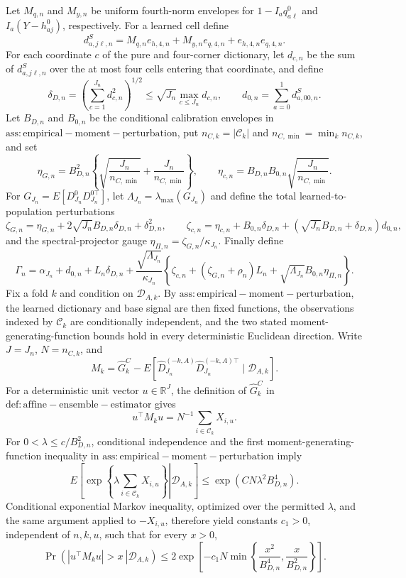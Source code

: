 Let \(M_{q,n}\) and \(M_{y,n}\) be uniform fourth-norm envelopes for \(1-I_aq^0_{a\ell}\) and \(I_a(Y-h^0_{aj})\), respectively.  For a learned cell define
\[
 d^S_{a,j\ell,n}=M_{q,n}e_{h,4,n}+M_{y,n}e_{q,4,n}+e_{h,4,n}e_{q,4,n}.
\]
For each coordinate \(c\) of the pure and four-corner dictionary, let \(d_{c,n}\) be the sum of \(d^S_{a,j\ell,n}\) over the at most four cells entering that coordinate, and define
\[
 \delta_{D,n}=\left(\sum_{c=1}^{J_n}d_{c,n}^2\right)^{1/2}
 \le \sqrt{J_n}\max_{c\le J_n}d_{c,n},
 \qquad
 d_{0,n}=\sum_{a=0}^1d^S_{a,00,n}.
\]
Let \(B_{D,n}\) and \(B_{0,n}\) be the conditional calibration envelopes in \(\mathrm{ass:empirical-moment-perturbation}\), put \(n_{C,k}=|\mathcal C_k|\) and \(n_{C,\min}=\min_k n_{C,k}\), and set
\[
 \eta_{G,n}=B_{D,n}^2\left\{\sqrt{\frac{J_n}{n_{C,\min}}}
 +\frac{J_n}{n_{C,\min}}\right\},
 \qquad
 \eta_{c,n}=B_{D,n}B_{0,n}\sqrt{\frac{J_n}{n_{C,\min}}}.
\]
For \(G_{J_n}=E[D^0_{J_n}D_{J_n}^{0\top}]\), let \(\Lambda_{J_n}=\lambda_{\max}(G_{J_n})\) and define the total learned-to-population perturbations
\[
 \zeta_{G,n}=\eta_{G,n}+2\sqrt{J_n}B_{D,n}\delta_{D,n}+\delta_{D,n}^2,
 \qquad
 \zeta_{c,n}=\eta_{c,n}+B_{0,n}\delta_{D,n}
 +(\sqrt{J_n}B_{D,n}+\delta_{D,n})d_{0,n},
\]
and the spectral-projector gauge \(\eta_{\Pi,n}=\zeta_{G,n}/\kappa_{J_n}\).  Finally define
\[
 \Gamma_n=\alpha_{J_n}+d_{0,n}+L_n\delta_{D,n}
 +\frac{\sqrt{\Lambda_{J_n}}}{\kappa_{J_n}}
 \left\{\zeta_{c,n}+(\zeta_{G,n}+\rho_n)L_n
 +\sqrt{\Lambda_{J_n}}B_{0,n}\eta_{\Pi,n}\right\}.
\]
Fix a fold \(k\) and condition on \(\mathcal D_{A,k}\).  By \(\mathrm{ass:empirical-moment-perturbation}\), the learned dictionary and base signal are then fixed functions, the observations indexed by \(\mathcal C_k\) are conditionally independent, and the two stated moment-generating-function bounds hold in every deterministic Euclidean direction.  Write \(J=J_n\), \(N=n_{C,k}\), and
\[
 M_k=\widehat G_k^C-E[\widehat D_{J_n}^{(-k,A)}
 \widehat D_{J_n}^{(-k,A)\top}\mid\mathcal D_{A,k}].
\]
For a deterministic unit vector \(u\in\mathbb R^J\), the definition of \(\widehat G_k^C\) in \(\mathrm{def:affine-ensemble-estimator}\) gives
\[
 u^\top M_ku=N^{-1}\sum_{i\in\mathcal C_k}X_{i,u}.
\]
For \(0<\lambda\le c/B_{D,n}^2\), conditional independence and the first moment-generating-function inequality in \(\mathrm{ass:empirical-moment-perturbation}\) imply
\[
 E\!\left[\left.\exp\!\left\{\lambda\sum_{i\in\mathcal C_k}X_{i,u}\right\}\right|\mathcal D_{A,k}\right]
 \le \exp(CN\lambda^2B_{D,n}^4).
\]
Conditional exponential Markov inequality, optimized over the permitted \(\lambda\), and the same argument applied to \(-X_{i,u}\), therefore yield constants \(c_1>0\), independent of \(n,k,u\), such that for every \(x>0\),
\[
 \Pr\!\left(\left.|u^\top M_ku|>x\ \right|\mathcal D_{A,k}\right)
 \le 2\exp\!\left[-c_1N\min\!\left\{
 \frac{x^2}{B_{D,n}^4},\frac{x}{B_{D,n}^2}\right\}\right]. \tag{1}
\]

